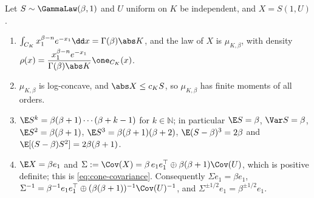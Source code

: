 \documentclass[../main.tex]{subfiles}
\begin{document}
\begin{lemma}
\label{lem:sol-cone-structure}
Let $S\sim\GammaLaw(\beta,1)$ and $U$ uniform on $K$ be independent, and $X=S(1,U)$.
\begin{enumerate}[label=(\alph*),leftmargin=2.2em]
  \item $\int_{C_K}x_1^{\beta-n}e^{-x_1}\dd x=\Gamma(\beta)\abs K$, and the law of $X$ is
  $\mu_{K,\beta}$, with density
  $\rho(x)=\dfrac{x_1^{\beta-n}e^{-x_1}}{\Gamma(\beta)\abs K}\one_{C_K}(x)$.
  \item $\mu_{K,\beta}$ is log-concave, and $\abs X\le c_KS$, so $\mu_{K,\beta}$ has finite
  moments of all orders.
  \item $\E S^k=\beta(\beta+1)\cdots(\beta+k-1)$ for $k\in\mathbb N$; in particular
  $\E S=\beta$, $\Var S=\beta$, $\E S^2=\beta(\beta+1)$, $\E S^3=\beta(\beta+1)(\beta+2)$,
  $\E(S-\beta)^3=2\beta$ and $\E[(S-\beta)S^2]=2\beta(\beta+1)$.
  \item $\E X=\beta e_1$ and
  $\Sigma:=\Cov(X)=\beta\,e_1e_1^\top\oplus\beta(\beta+1)\Cov(U)$, which is positive
  definite; this is \eqref{eq:cone-covariance}.  Consequently $\Sigma e_1=\beta e_1$,
  $\Sigma^{-1}=\beta^{-1}e_1e_1^\top\oplus(\beta(\beta+1))^{-1}\Cov(U)^{-1}$, and
  $\Sigma^{\pm1/2}e_1=\beta^{\pm1/2}e_1$.
\end{enumerate}
\end{lemma}
\end{document}

